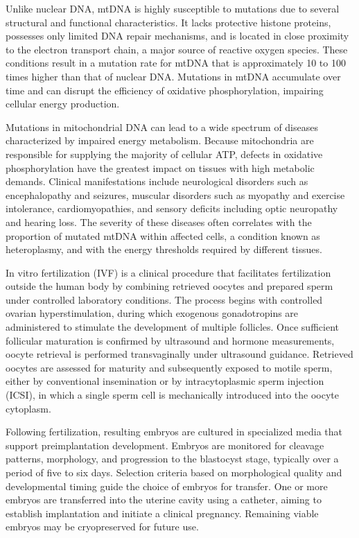 Unlike nuclear DNA, mtDNA is highly susceptible to mutations due to several structural and functional characteristics. It lacks protective histone proteins, possesses only limited DNA repair mechanisms, and is located in close proximity to the electron transport chain, a major source of reactive oxygen species. These conditions result in a mutation rate for mtDNA that is approximately 10 to 100 times higher than that of nuclear DNA. Mutations in mtDNA accumulate over time and can disrupt the efficiency of oxidative phosphorylation, impairing cellular energy production.

Mutations in mitochondrial DNA can lead to a wide spectrum of diseases characterized by impaired energy metabolism. Because mitochondria are responsible for supplying the majority of cellular ATP, defects in oxidative phosphorylation have the greatest impact on tissues with high metabolic demands. Clinical manifestations include neurological disorders such as encephalopathy and seizures, muscular disorders such as myopathy and exercise intolerance, cardiomyopathies, and sensory deficits including optic neuropathy and hearing loss. The severity of these diseases often correlates with the proportion of mutated mtDNA within affected cells, a condition known as heteroplasmy, and with the energy thresholds required by different tissues.

In vitro fertilization (IVF) is a clinical procedure that facilitates fertilization outside the human body by combining retrieved oocytes and prepared sperm under controlled laboratory conditions. The process begins with controlled ovarian hyperstimulation, during which exogenous gonadotropins are administered to stimulate the development of multiple follicles. Once sufficient follicular maturation is confirmed by ultrasound and hormone measurements, oocyte retrieval is performed transvaginally under ultrasound guidance. Retrieved oocytes are assessed for maturity and subsequently exposed to motile sperm, either by conventional insemination or by intracytoplasmic sperm injection (ICSI), in which a single sperm cell is mechanically introduced into the oocyte cytoplasm.

Following fertilization, resulting embryos are cultured in specialized media that support preimplantation development. Embryos are monitored for cleavage patterns, morphology, and progression to the blastocyst stage, typically over a period of five to six days. Selection criteria based on morphological quality and developmental timing guide the choice of embryos for transfer. One or more embryos are transferred into the uterine cavity using a catheter, aiming to establish implantation and initiate a clinical pregnancy. Remaining viable embryos may be cryopreserved for future use.


